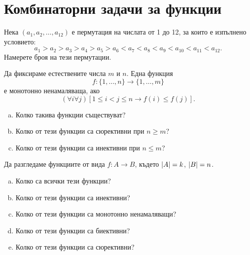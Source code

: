 \section{Комбинаторни задачи за функции}

\begin{problem}
  Нека $(a_1,a_2,\dots,a_{12})$ е пермутация на числата от 1 до 12, за които е изпълнено условието:
  \[a_1 > a_2 > a_3 > a_4 > a_5 > a_6 < a_7 < a_8 < a_9 < a_{10} < a_{11} < a_{12}.\]
  Намерете броя на тези пермутации.  
\end{problem}

\begin{problem}
  Да фиксираме естествените числа $m$ и $n$.
  Една функция \[f:\{1,\dots,n\}\to\{1,\dots,m\}\] е монотонно ненамаляваща, ако
  \[(\forall i\forall j)[1\leq i<j\leq n \rightarrow f(i)\leq f(j)].\]
  \begin{enumerate}[a)]
  \item
    Колко такива функции съществуват?
  \item
    Колко от тези функции са сюрективни при $n\geq m$?
  \item
    Колко от тези функции са инективни при $n\leq m$?
  \end{enumerate}
\end{problem}

\begin{problem}
  Да разгледаме функциите от вида $f:A\to B$,
  където $\lvert{A}\rvert = k$, $\lvert{B}\rvert = n$.
  \begin{enumerate}[a)]
  \item 
    Колко са всички тези функции?
  \item
    Колко от тези функции са инективни?
  \item
    Колко от тези функции са монотонно ненамаляващи?
  \item
    Колко от тези функции са биективни?
  \item
    Колко от тези функции са сюрективни?
  \end{enumerate}
\end{problem}


